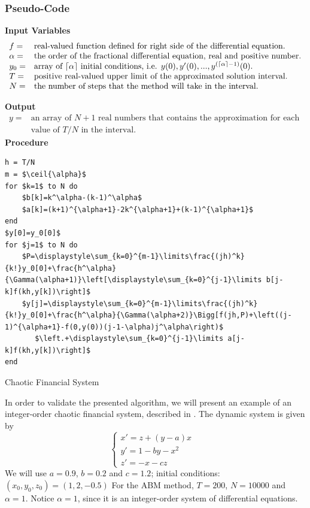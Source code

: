 \subsubsection{Pseudo-Code}
\textbf{Input Variables}
\begin{equation*}
\begin{array}{ll}
f=&\text{real-valued function defined for right side of the differential equation.}\\
\alpha=&\text{the order of the fractional differential equation, real and positive number.}\\
y_0=&\text{array of $\lceil\alpha\rceil$ initial conditions, i.e. $y(0),y'(0),...,y^{(\lceil\alpha\rceil-1)}(0)$.}\\
T=&\text{positive real-valued upper limit of the approximated solution interval.}\\
N=&\text{the number of steps that the method will take in the interval.}\\ 
\end{array}
\end{equation*}
        
\textbf{Output}
\begin{equation*}
\begin{array}{ll}
y=&\text{an array of $N+1$ real numbers that contains the approximation for each }\\
&\text{value of $T/N$ in the interval.}
\end{array}
\end{equation*}
\textbf{Procedure}
\begin{lstlisting}[mathescape=true]
h = T/N
m = $\ceil{\alpha}$
for $k=1$ to N do
    $b[k]=k^\alpha-(k-1)^\alpha$
    $a[k]=(k+1)^{\alpha+1}-2k^{\alpha+1}+(k-1)^{\alpha+1}$
end
$y[0]=y_0[0]$
for $j=1$ to N do
    $P=\displaystyle\sum_{k=0}^{m-1}\limits\frac{(jh)^k}{k!}y_0[0]+\frac{h^\alpha}{\Gamma(\alpha+1)}\left[\displaystyle\sum_{k=0}^{j-1}\limits b[j-k]f(kh,y[k])\right]$
    $y[j]=\displaystyle\sum_{k=0}^{m-1}\limits\frac{(jh)^k}{k!}y_0[0]+\frac{h^\alpha}{\Gamma(\alpha+2)}\Bigg[f(jh,P)+\left((j-1)^{\alpha+1}-f(0,y(0))(j-1-\alpha)j^\alpha\right)$
       $\left.+\displaystyle\sum_{k=0}^{j-1}\limits a[j-k]f(kh,y[k])\right]$
end
        \end{lstlisting}


\begin{exmp}\label{ex:finance}
Chaotic Financial System
\end{exmp}
In order to validate the presented algorithm, we will present an example of an integer-order chaotic financial system, described in \cite{kocamaz2015synchronization}. The dynamic system is given by
\begin{equation}
\begin{cases}
    x'=z+(y-a)x&\\
    y'=1-by-x^2&\\
    z'=-x-cz&
\end{cases}
\end{equation}
We will use $a=0.9$, $b=0.2$ and $c=1.2$; initial conditions: $(x_0,y_0,z_0)=(1,2,-0.5)$ For the ABM method, $T=200$, $N=10000$ and $\alpha=1$. Notice $\alpha=1$, since it is an integer-order system of differential equations.


